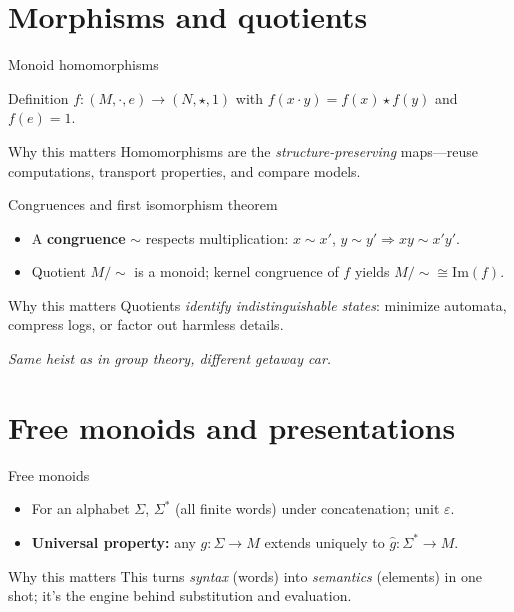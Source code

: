 \documentclass[aspectratio=169,11pt]{beamer}
\newcommand{\Img}{\mathrm{Im}}
\newcommand{\tline}[1]{\par\medskip\textcolor{transit}{\emph{#1}}\par\medskip}
\begin{document}
\section{Morphisms and quotients}
\begin{frame}{Monoid homomorphisms}
\begin{block}{Definition}
$f:(M,\cdot,e)\to (N,\star,1)$ with $f(x\cdot y)=f(x)\star f(y)$ and $f(e)=1$.
\end{block}
\begin{alertblock}{Why this matters}
Homomorphisms are the \emph{structure-preserving} maps—reuse computations, transport properties, and compare models.
\end{alertblock}
\end{frame}

\begin{frame}{Congruences and first isomorphism theorem}
\begin{itemize}
  \item A \textbf{congruence} $\sim$ respects multiplication: $x\sim x'$, $y\sim y'\Rightarrow xy\sim x'y'$.
  \item Quotient $M/{\sim}$ is a monoid; kernel congruence of $f$ yields $M/{\sim}\cong\Img(f)$.
\end{itemize}
\begin{alertblock}{Why this matters}
Quotients \emph{identify indistinguishable states}: minimize automata, compress logs, or factor out harmless details.
\end{alertblock}
\tline{Same heist as in group theory, different getaway car.}
\end{frame}

\section{Free monoids and presentations}
\begin{frame}{Free monoids}
\begin{itemize}
  \item For an alphabet $\Sigma$, $\Sigma^\ast$ (all finite words) under concatenation; unit $\varepsilon$.
  \item \textbf{Universal property:} any $g:\Sigma\to M$ extends uniquely to $\widehat g:\Sigma^\ast\to M$.
\end{itemize}
\begin{alertblock}{Why this matters}
This turns \emph{syntax} (words) into \emph{semantics} (elements) in one shot; it’s the engine behind substitution and evaluation.
\end{alertblock}
\end{frame}
\end{document}
